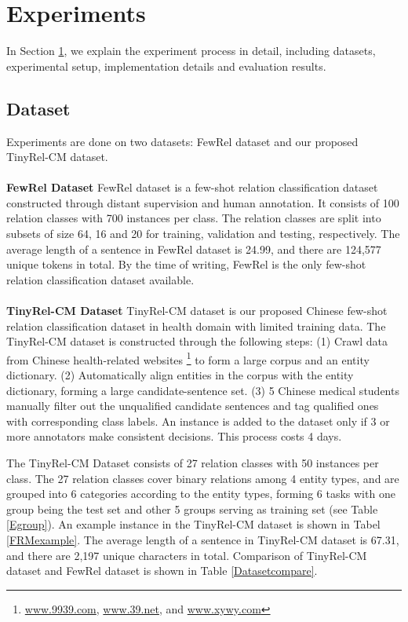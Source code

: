 \section{Experiments}
\label{exp}
In Section \ref{exp}, we explain the experiment process in detail, including datasets, experimental setup, implementation details and evaluation results.

\subsection{Dataset}
\label{dataset}
Experiments are done on two datasets: FewRel dataset \cite{han-etal-2018-fewrel} and our proposed TinyRel-CM dataset.
~\\
~\\
\textbf{FewRel Dataset} FewRel dataset \cite{han-etal-2018-fewrel} is a few-shot relation classification dataset constructed through distant supervision and human annotation. It consists of 100 relation classes with 700 instances per class. The relation classes are split into subsets of size 64, 16 and 20 for training, validation and testing, respectively.
The average length of a sentence in FewRel dataset is 24.99, and there are 124,577 unique tokens in total. By the time of writing, FewRel is the only few-shot relation classification dataset available.
~\\
~\\
\textbf{TinyRel-CM Dataset} TinyRel-CM dataset is our proposed Chinese few-shot relation classification dataset in health domain with limited training data. The TinyRel-CM dataset is constructed through the following steps: (1) Crawl data from Chinese health-related websites \footnote{\url{www.9939.com}, \url{www.39.net}, and \url{www.xywy.com}} to form a large corpus and an entity dictionary. (2) Automatically align entities in the corpus with the entity dictionary, forming a large candidate-sentence set. (3) 5 Chinese medical students manually filter out the unqualified candidate sentences and tag qualified ones with corresponding class labels. An instance is added to the dataset only if 3 or more annotators make consistent decisions. This process costs 4 days.

The TinyRel-CM Dataset consists of 27 relation classes with 50 instances per class. The 27 relation classes cover binary relations among 4 entity types, and are grouped into 6 categories according to the entity types, forming 6 tasks with one group being the test set and other 5 groups serving as training set (see Table \ref{Egroup}). An example instance in the TinyRel-CM dataset is shown in Tabel \ref{FRMexample}. The average length of a sentence in TinyRel-CM dataset is 67.31, and there are 2,197 unique characters in total. Comparison of TinyRel-CM dataset and FewRel dataset is shown in Table \ref{Datasetcompare}.

